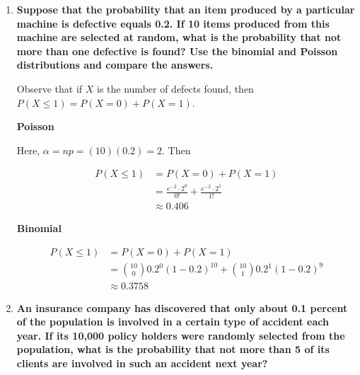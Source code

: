 \documentclass[10pt, oneside]{article}
\begin{document}
\begin{enumerate}[label=8.\arabic*]
\begin{enumerate}
	\[ E[X_2] = \sum^{\infty}_{k = 1} k \cdot \frac{e^{-2} \cdot 2^{k+3}}{(k+3)!} \approx \boxed{0.218} \]
	
	Observe that if $Y$ is the total number of tankers arriving, then it is easy to see that $Y = X_1 + X_2$, and consequently $E[Y] = E[X_1] + E[X_2]$.
	\end{enumerate}

\item  \begin{tcolorbox}[
  colback=Cerulean!5!white,
  colframe=Cerulean!75!black]
\textbf{Suppose that the probability that an item produced by a particular machine is defective equals 0.2. If 10 items produced from this machine are selected at random, what is the probability that not more than one defective is found? Use the binomial and Poisson distributions and compare the answers.}
\end{tcolorbox}

Observe that if $X$ is the number of defects found, then $P(X \leq 1) = P(X = 0) + P(X = 1)$.

\textbf{Poisson}

Here, $\alpha = np = (10)(0.2) = 2$. Then

\begin{align*}
P(X \leq 1) &= P(X = 0) + P(X = 1) \\
&= \frac{e^{-2} \cdot 2^0}{0!} + \frac{e^{-2} \cdot 2^1}{1!} \\
&\approx \boxed{0.406}
\end{align*}

\textbf{Binomial}

\begin{align*}
P(X \leq 1) &= P(X = 0) + P(X = 1) \\
&= \binom{10}{0} 0.2^0 (1-0.2)^{10} + \binom{10}{1} 0.2^1 (1 -0.2)^9 \\
&\approx \boxed{0.3758}
\end{align*}

\item  \begin{tcolorbox}[
  colback=Cerulean!5!white,
  colframe=Cerulean!75!black]
\textbf{An insurance company has discovered that only about 0.1 percent of the population is involved in a certain type of accident each year. If its 10,000 policy holders were randomly selected from the population, what is the probability that not more than 5 of its clients are involved in such an accident next year?}
\end{tcolorbox}


\end{enumerate}
\end{document}
